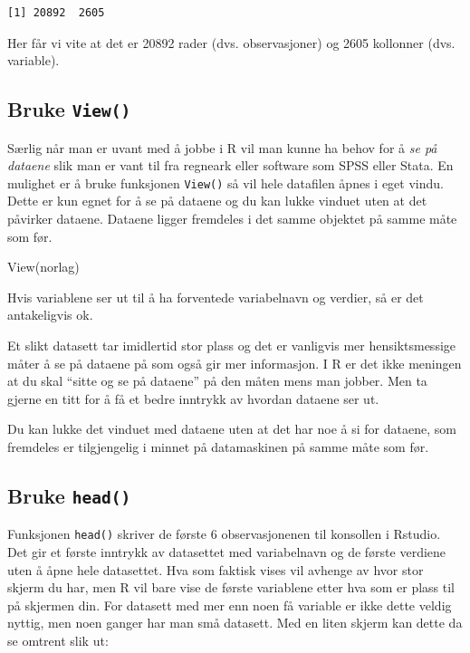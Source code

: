 \documentclass[
  letterpaper,
  DIV=11,
  numbers=noendperiod]{scrreprt}
\newenvironment{Shaded}{\begin{snugshade}}{\end{snugshade}}
\newcommand{\FunctionTok}[1]{\textcolor[rgb]{0.28,0.35,0.67}{#1}}
\newcommand{\NormalTok}[1]{\textcolor[rgb]{0.00,0.23,0.31}{#1}}
\theoremstyle{definition}
\theoremstyle{remark}
\begin{document}
\begin{verbatim}
[1] 20892  2605
\end{verbatim}

Her får vi vite at det er 20892 rader (dvs. observasjoner) og 2605
kollonner (dvs. variable).

\hypertarget{bruke-view}{%
\subsection{\texorpdfstring{Bruke
\texttt{View()}}{Bruke View()}}\label{bruke-view}}

Særlig når man er uvant med å jobbe i R vil man kunne ha behov for å
\emph{se på dataene} slik man er vant til fra regneark eller software
som SPSS eller Stata. En mulighet er å bruke funksjonen \texttt{View()}
så vil hele datafilen åpnes i eget vindu. Dette er kun egnet for å se på
dataene og du kan lukke vinduet uten at det påvirker dataene. Dataene
ligger fremdeles i det samme objektet på samme måte som før.

\begin{Shaded}
\begin{Highlighting}[]
\FunctionTok{View}\NormalTok{(norlag)}
\end{Highlighting}
\end{Shaded}

Hvis variablene ser ut til å ha forventede variabelnavn og verdier, så
er det antakeligvis ok.

Et slikt datasett tar imidlertid stor plass og det er vanligvis mer
hensiktsmessige måter å se på dataene på som også gir mer informasjon. I
R er det ikke meningen at du skal ``sitte og se på dataene'' på den
måten mens man jobber. Men ta gjerne en titt for å få et bedre inntrykk
av hvordan dataene ser ut.

Du kan lukke det vinduet med dataene uten at det har noe å si for
dataene, som fremdeles er tilgjengelig i minnet på datamaskinen på samme
måte som før.

\hypertarget{bruke-head}{%
\subsection{\texorpdfstring{Bruke
\texttt{head()}}{Bruke head()}}\label{bruke-head}}

Funksjonen \texttt{head()} skriver de første 6 observasjonenen til
konsollen i Rstudio. Det gir et første inntrykk av datasettet med
variabelnavn og de første verdiene uten å åpne hele datasettet. Hva som
faktisk vises vil avhenge av hvor stor skjerm du har, men R vil bare
vise de første variablene etter hva som er plass til på skjermen din.
For datasett med mer enn noen få variable er ikke dette veldig nyttig,
men noen ganger har man små datasett. Med en liten skjerm kan dette da
se omtrent slik ut:
\end{document}
